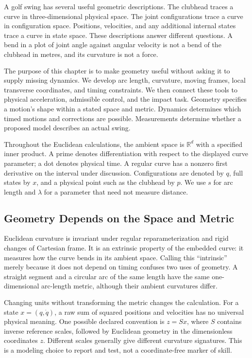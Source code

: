 \documentclass[12pt, openany]{book}
\theoremstyle{plain}
\begin{document}
A golf swing has several useful geometric descriptions. The clubhead traces a
curve in three-dimensional physical space. The joint configurations trace a
curve in configuration space. Positions, velocities, and any additional
internal states trace a curve in state space. These descriptions answer
different questions. A bend in a plot of joint angle against angular velocity
is not a bend of the clubhead in metres, and its curvature is not a force.

The purpose of this chapter is to make geometry useful without asking it to
supply missing dynamics. We develop arc length, curvature, moving frames,
local transverse coordinates, and timing constraints. We then connect these
tools to physical acceleration, admissible control, and the impact task.
Geometry specifies a motion's shape within a stated space and metric.
Dynamics determines which timed motions and corrections are possible.
Measurements determine whether a proposed model describes an actual swing.

Throughout the Euclidean calculations, the ambient space is $\mathbb R^d$
with a specified inner product. A prime denotes differentiation with respect
to the displayed curve parameter; a dot denotes physical time. A regular
curve has a nonzero first derivative on the interval under discussion.
Configurations are denoted by $q$, full states by $x$, and a physical point
such as the clubhead by $p$. We use $s$ for arc length and $\lambda$ for a
parameter that need not measure distance.

\subsection{Geometry Depends on the Space and Metric}

Euclidean curvature is invariant under regular reparameterization and rigid
changes of Cartesian frame. It is an extrinsic property of the embedded
curve: it measures how the curve bends in its ambient space. Calling this
``intrinsic'' merely because it does not depend on timing confuses two uses
of geometry. A straight segment and a circular arc of the same length have
the same one-dimensional arc-length metric, although their ambient
curvatures differ.

Changing units without transforming the metric changes the calculation.
For a state $x=(q,\dot q)$, a raw sum of squared positions and velocities has
no universal physical meaning. One possible declared convention is
$z=Sx$, where $S$ contains inverse reference scales, followed by Euclidean
geometry in the dimensionless coordinates $z$. Different scales generally
give different curvature signatures. This is a modeling choice to report
and test, not a coordinate-free marker of skill.
\end{document}
